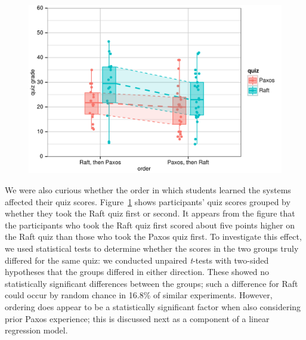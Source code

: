 \begin{figure}
\centering
{
\includegraphics{userstudy/order}
}
\label{fig:userstudy:order}
\end{figure}

We were also curious whether the order in which students learned the systems
affected their quiz scores.
Figure~\ref{fig:userstudy:order} shows participants' quiz scores grouped by
whether they took the Raft quiz first or second.
It appears from the figure that the participants who took the Raft quiz
first scored about five points higher on the Raft quiz than those who
took the Paxos quiz first.
To investigate this effect, we used statistical tests to determine
whether the scores in the two groups truly differed for the same quiz:
we conducted
unpaired \emph{t}-tests with two-sided hypotheses that the groups
differed in either direction.
These showed no statistically significant differences between
the groups; such a difference for Raft could occur by random
chance in 16.8\% of similar experiments.
However, ordering does appear to be a statistically significant factor
when also considering prior Paxos experience; this is discussed next as
a component of a linear regression model.

